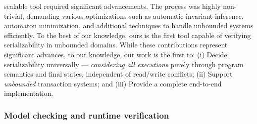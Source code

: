 scalable tool required significant advancements. The process was highly 
non-trivial, demanding various optimizations such as automatic invariant 
inference, automaton minimization, and additional techniques to handle 
unbounded systems efficiently. To the best of our knowledge, ours is the first 
tool capable of verifying serializability in unbounded domains.
%
While these contributions represent significant advances, to our knowledge, our 
work is the first to:
(i) Decide serializability universally --- \textit{considering all executions} 
purely through program semantics and final states, independent of read/write 
conflicts; 
(ii) Support \textit{unbounded} transaction systems; and
(iii) Provide a complete end-to-end implementation.



\subsubsection{Model checking and runtime verification}

